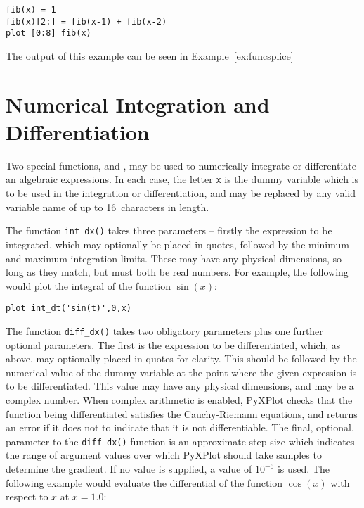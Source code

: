 \begin{verbatim}
fib(x) = 1
fib(x)[2:] = fib(x-1) + fib(x-2)
plot [0:8] fib(x)
\end{verbatim}


\noindent The output of this example can be seen in Example~\ref{ex:funcsplice}

\section{Numerical Integration and Differentiation}

 Two special functions,
 and , may be used to numerically
integrate or differentiate an algebraic expressions.  In each case, the letter
{\tt x} is the dummy variable which is to be used in the integration or
differentiation, and may be replaced by any valid variable name of up to
16~characters in length.

The function {\tt int\_dx()} takes three parameters -- firstly the expression
to be integrated, which may optionally be placed in quotes, followed by the
minimum and maximum integration limits. These may have any physical dimensions,
so long as they match, but must both be real numbers. For example, the
following would plot the integral of the function $\sin(x)$:

\begin{verbatim}
plot int_dt('sin(t)',0,x)
\end{verbatim} 

The function {\tt diff\_dx()} takes two obligatory parameters plus one further
optional parameters. The first is the expression to be differentiated, which,
as above, may optionally placed in quotes for clarity. This should be followed
by the numerical value of the dummy variable at the point where the given
expression is to be differentiated. This value may have any physical
dimensions, and may be a complex number. When complex arithmetic is enabled,
PyXPlot checks that the function being differentiated satisfies the
Cauchy-Riemann equations, and returns an error if it does not to indicate that it
is not differentiable.  The final, optional, parameter to the {\tt diff\_dx()}
function is an approximate step size which indicates the range of argument
values over which PyXPlot should take samples to determine the gradient. If no
value is supplied, a value of $10^{-6}$ is used.  The following example would
evaluate the differential of the function $\cos(x)$ with respect to $x$ at
$x=1.0$:

